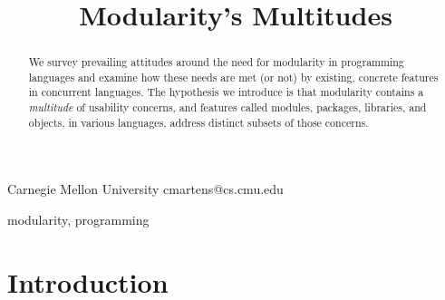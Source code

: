 \documentclass{sigplanconf}[10pt]
\begin{document}
\setlength{\pdfpageheight}{\paperheight}
\setlength{\pdfpagewidth}{\paperwidth}






\title{Modularity's Multitudes}

           {Carnegie Mellon University}
           {cmartens@cs.cmu.edu}

\maketitle

\begin{abstract}
We survey prevailing attitudes around the need for modularity in
programming languages and examine how these needs are met (or not) by
existing, concrete features in concurrent languages. The hypothesis we introduce
is that modularity contains a {\em multitude} of usability concerns,
and features called modules, packages, libraries, and objects, in various
languages, address distinct subsets of those concerns. 
\end{abstract}



\keywords
modularity, programming

\section{Introduction}
\end{document}
